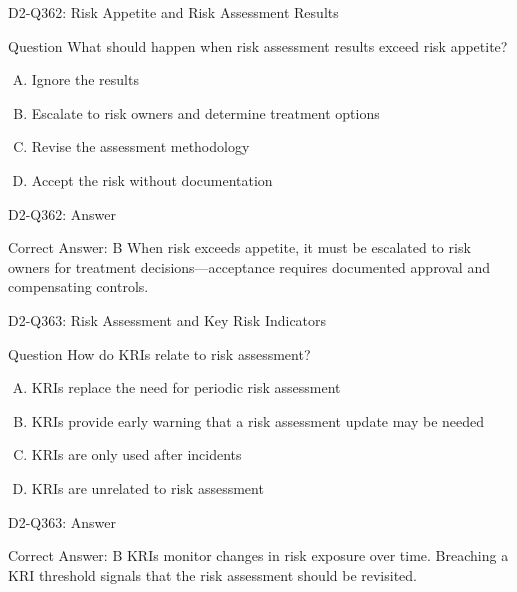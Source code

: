 \documentclass{beamer}
\begin{document}
\begin{frame}{D2-Q362: Risk Appetite and Risk Assessment Results}
	\begin{block}{Question}
		What should happen when risk assessment results exceed risk appetite?
	\end{block}
	\begin{enumerate}[(A)]
		\item Ignore the results
		\item Escalate to risk owners and determine treatment options
		\item Revise the assessment methodology
		\item Accept the risk without documentation
	\end{enumerate}
\end{frame}
\begin{frame}{D2-Q362: Answer}
	\begin{block}{Correct Answer: B}
		When risk exceeds appetite, it must be escalated to risk owners for treatment decisions—acceptance requires documented approval and compensating controls.
	\end{block}
\end{frame}

\begin{frame}{D2-Q363: Risk Assessment and Key Risk Indicators}
	\begin{block}{Question}
		How do KRIs relate to risk assessment?
	\end{block}
	\begin{enumerate}[(A)]
		\item KRIs replace the need for periodic risk assessment
		\item KRIs provide early warning that a risk assessment update may be needed
		\item KRIs are only used after incidents
		\item KRIs are unrelated to risk assessment
	\end{enumerate}
\end{frame}
\begin{frame}{D2-Q363: Answer}
	\begin{block}{Correct Answer: B}
		KRIs monitor changes in risk exposure over time. Breaching a KRI threshold signals that the risk assessment should be revisited.
	\end{block}
\end{frame}
\end{document}
